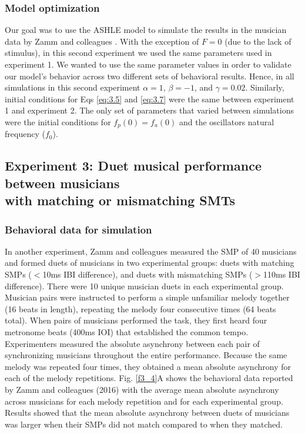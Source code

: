 \documentclass{report}
\begin{document}
\subsubsection{Model optimization}

Our goal was to use the ASHLE model to simulate the results in the musician data by Zamm and colleagues \cite{zamm2018musicians}. With the exception of $F = 0$	(due to the lack of stimulus), in this second experiment we used the same parameters used in experiment 1. We wanted to use the same parameter values in order to validate our model's behavior across two different sets of behavioral results. Hence, in all simulations in this second experiment $\alpha = 1$, $\beta = −1$, and $\gamma = 	0.02$. Similarly, initial conditions for Eqs \eqref{eq:3.5} and \eqref{eq:3.7} were the same between experiment 1 and experiment 2. The only set of parameters that varied between simulations were the initial conditions for $f_p(0)=f_a(0)$ and the oscillators natural frequency ($f_0$).

\subsection{Experiment 3: Duet musical performance between musicians \\ with matching or mismatching SMTs}

\subsubsection{Behavioral data for simulation}

In another experiment, Zamm and colleagues \cite{zamm2016endogenous} measured the SMP of 40 musicians and formed duets of musicians in two experimental groups: duets with matching SMPs ($<$10ms IBI difference), and duets with mismatching SMPs ($>$110ms IBI difference). There were 10 unique musician duets in each experimental group. Musician pairs were instructed to perform a simple unfamiliar melody together (16 beats in length), repeating the melody four consecutive times (64 beats total). When pairs of musicians performed the task, they first heard four metronome beats (400ms IOI) that established the common tempo. Experimenters measured the absolute asynchrony between each pair of synchronizing musicians throughout the entire performance. Because the same melody was repeated four times, they obtained a mean absolute asynchrony for each of the melody repetitions. Fig.{} \ref{f3_4}A shows the behavioral data reported by Zamm and colleagues (2016) with the average mean absolute asynchrony across musicians for each melody repetition and for each experimental group. Results showed that the mean absolute asynchrony between duets of musicians was larger when their SMPs did not match compared to when they matched.
\end{document}
